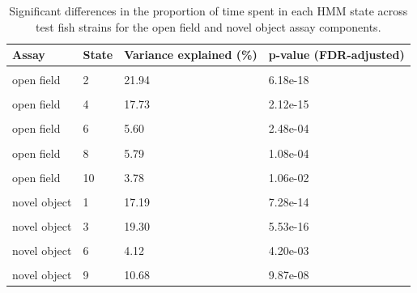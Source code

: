 \documentclass[
]{book}
\begin{document}
\begin{table}

\caption{\label{tab:pilot-dge-tbl}Significant differences in the proportion of time spent in each HMM state across test fish strains for the open field and novel object assay components.}
\centering
\begin{tabular}[t]{llll}
\toprule
Assay & State & Variance explained (\%) & p-value (FDR-adjusted)\\
\midrule
\cellcolor{gray!6}{open field} & \cellcolor{gray!6}{1} & \cellcolor{gray!6}{26.62} & \cellcolor{gray!6}{3.60e-22}\\
open field & 2 & 21.94 & 6.18e-18\\
\cellcolor{gray!6}{open field} & \cellcolor{gray!6}{3} & \cellcolor{gray!6}{28.21} & \cellcolor{gray!6}{4.45e-24}\\
open field & 4 & 17.73 & 2.12e-15\\
\cellcolor{gray!6}{open field} & \cellcolor{gray!6}{5} & \cellcolor{gray!6}{7.48} & \cellcolor{gray!6}{2.78e-05}\\
\addlinespace
open field & 6 & 5.60 & 2.48e-04\\
\cellcolor{gray!6}{open field} & \cellcolor{gray!6}{7} & \cellcolor{gray!6}{5.46} & \cellcolor{gray!6}{3.11e-04}\\
open field & 8 & 5.79 & 1.08e-04\\
\cellcolor{gray!6}{open field} & \cellcolor{gray!6}{9} & \cellcolor{gray!6}{7.36} & \cellcolor{gray!6}{8.96e-06}\\
open field & 10 & 3.78 & 1.06e-02\\
\addlinespace
\cellcolor{gray!6}{open field} & \cellcolor{gray!6}{13} & \cellcolor{gray!6}{4.66} & \cellcolor{gray!6}{3.42e-03}\\
novel object & 1 & 17.19 & 7.28e-14\\
\cellcolor{gray!6}{novel object} & \cellcolor{gray!6}{2} & \cellcolor{gray!6}{14.28} & \cellcolor{gray!6}{2.92e-11}\\
novel object & 3 & 19.30 & 5.53e-16\\
\cellcolor{gray!6}{novel object} & \cellcolor{gray!6}{4} & \cellcolor{gray!6}{13.12} & \cellcolor{gray!6}{1.26e-10}\\
\addlinespace
novel object & 6 & 4.12 & 4.20e-03\\
\cellcolor{gray!6}{novel object} & \cellcolor{gray!6}{7} & \cellcolor{gray!6}{8.93} & \cellcolor{gray!6}{1.84e-06}\\
novel object & 9 & 10.68 & 9.87e-08\\
\bottomrule
\end{tabular}
\end{table}
\end{document}
